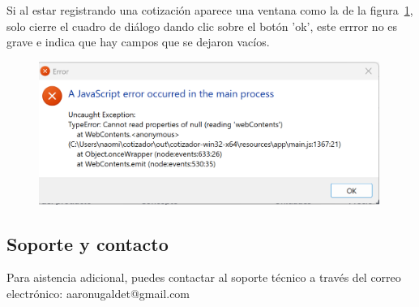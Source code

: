 \documentclass{Pretexto/bluereport}
\begin{document}
\begin{definicion}
    Si al estar registrando una cotización aparece una ventana como la de la figura~\ref{fig:error}, solo cierre el cuadro de diálogo
    dando clic sobre el botón 'ok', este errror no es grave e indica que hay campos que se dejaron vacíos.
    \begin{figure}[H]
        \centering
        \includegraphics[width=0.99\textwidth]{img/error.png}
        \caption{}
        \label{fig:error}
    \end{figure}
\end{definicion}


\subsection{Soporte y contacto}

Para aistencia adicional, puedes contactar al soporte técnico a través del correo electrónico: aaronugaldet@gmail.com
\pagebreak
\end{document}
